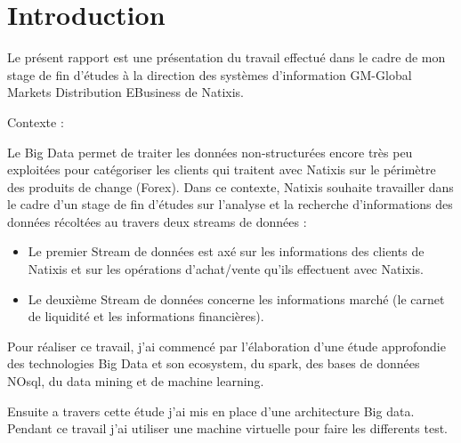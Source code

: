 \section*{Introduction} %

Le présent rapport est une présentation du travail effectué dans le cadre de mon stage de fin d'études à la direction des systèmes d'information GM-Global Markets Distribution EBusiness de Natixis.

Contexte : 

Le Big Data permet de traiter les données non-structurées encore très peu exploitées pour catégoriser les clients qui traitent avec Natixis sur le périmètre des produits de change (Forex). Dans ce contexte, Natixis souhaite travailler dans le cadre d’un stage de fin d’études
sur l’analyse et la recherche d’informations des données récoltées au travers deux streams de données :

\begin {itemize}
\item Le premier Stream de données est axé sur les informations des clients de Natixis et sur les opérations d’achat/vente qu’ils effectuent avec Natixis.

\item Le deuxième Stream de données concerne les informations marché (le carnet de liquidité et les informations financières).
\end{itemize}

Pour réaliser ce travail, j'ai commencé par l'élaboration d'une étude approfondie des technologies Big Data et son ecosystem, du spark, des bases de données NOsql, du data mining et de machine learning.

Ensuite a travers cette étude j'ai mis en place d'une architecture Big data. Pendant ce travail j'ai utiliser une machine virtuelle pour faire les differents test.
